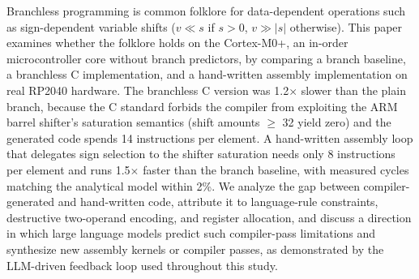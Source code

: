 Branchless programming is common folklore for data-dependent operations such as sign-dependent
variable shifts ($v \ll s$ if $s>0$, $v \gg |s|$ otherwise). This paper examines whether the
folklore holds on the Cortex-M0+, an in-order microcontroller core without branch predictors,
by comparing a branch baseline, a branchless C implementation, and a hand-written assembly
implementation on real RP2040 hardware. The branchless C version was 1.2$\times$ slower than
the plain branch, because the C standard forbids the compiler from exploiting the ARM barrel
shifter's saturation semantics (shift amounts $\geq$ 32 yield zero) and the generated code spends
14 instructions per element. A hand-written assembly loop that delegates sign selection to the
shifter saturation needs only 8 instructions per element and runs 1.5$\times$ faster than the
branch baseline, with measured cycles matching the analytical model within 2\%. We analyze the
gap between compiler-generated and hand-written code, attribute it to language-rule constraints,
destructive two-operand encoding, and register allocation, and discuss a direction in which
large language models predict such compiler-pass limitations and synthesize new assembly
kernels or compiler passes, as demonstrated by the LLM-driven feedback loop used throughout
this study.
